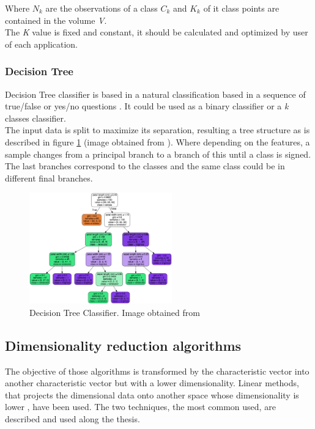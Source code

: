 Where $N_k$ are the observations of a class $C_k$ and $K_k$ of it class points are contained in the volume \textit{V}.\\

The \textit{K} value is fixed and constant, it should be calculated and optimized by user of each application.\\

\subsubsection{Decision Tree}
Decision Tree classifier is based in a natural classification based in a sequence of true/false or yes/no questions \cite{Duda}. It could be used as a binary classifier or a \textit{k} classes classifier. \\

The input data is split to maximize its separation, resulting a tree structure \cite{ClassifiersReview} as is described in figure \ref{fig:Tree} (image obtained from \cite{Treeimage}). Where depending on the features, a sample changes from a principal branch to a branch of this until a class is signed. The last branches correspond to the classes and the same class could be in different final branches. \\

\begin{figure}[htb]
\centering
\includegraphics[width=0.55\textwidth]{images_miscelaneus/tree.png}
\caption{Decision Tree Classifier. Image obtained from \cite{Treeimage}} \label{fig:Tree}
\end{figure}

\subsection{Dimensionality reduction algorithms}
The objective of those algorithms is transformed by the characteristic vector into another characteristic vector but with a lower dimensionality. Linear methods, that projects the dimensional data onto another space whose dimensionality is lower \cite{Duda}, have been used. The two techniques, the most common used, are described and used along the thesis.\\


